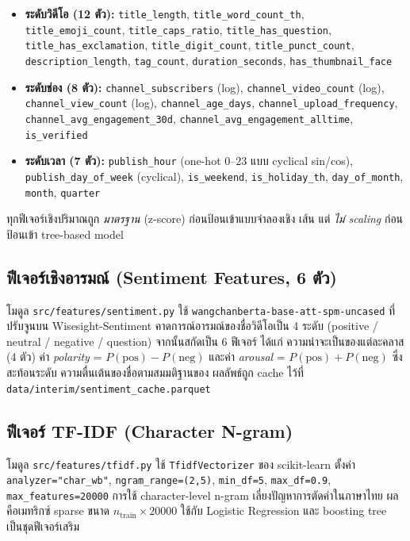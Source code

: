 \begin{itemize}[leftmargin=2em]
  \item \textbf{ระดับวิดีโอ (12 ตัว):} \texttt{title\_length},
        \texttt{title\_word\_count\_th}, \texttt{title\_emoji\_count},
        \texttt{title\_caps\_ratio}, \texttt{title\_has\_question},
        \texttt{title\_has\_exclamation}, \texttt{title\_digit\_count},
        \texttt{title\_punct\_count}, \texttt{description\_length},
        \texttt{tag\_count}, \texttt{duration\_seconds}, \texttt{has\_thumbnail\_face}
  \item \textbf{ระดับช่อง (8 ตัว):} \texttt{channel\_subscribers} (log),
        \texttt{channel\_video\_count} (log), \texttt{channel\_view\_count} (log),
        \texttt{channel\_age\_days}, \texttt{channel\_upload\_frequency},
        \texttt{channel\_avg\_engagement\_30d},
        \texttt{channel\_avg\_engagement\_alltime}, \texttt{is\_verified}
  \item \textbf{ระดับเวลา (7 ตัว):} \texttt{publish\_hour} (one-hot 0--23
        แบบ cyclical sin/cos), \texttt{publish\_day\_of\_week} (cyclical),
        \texttt{is\_weekend}, \texttt{is\_holiday\_th}, \texttt{day\_of\_month},
        \texttt{month}, \texttt{quarter}
\end{itemize}

ทุกฟีเจอร์เชิงปริมาณถูก \emph{มาตรฐาน} (z-score) ก่อนป้อนเข้าแบบจำลองเชิง
เส้น แต่ \emph{ไม่ scaling} ก่อนป้อนเข้า tree-based model

\subsection{ฟีเจอร์เชิงอารมณ์ (Sentiment Features, 6 ตัว)}

โมดูล \texttt{src/features/sentiment.py} ใช้ \texttt{wangchanberta-base-att-spm-uncased}
ที่ปรับจูนบน Wisesight-Sentiment คาดการณ์อารมณ์ของชื่อวิดีโอเป็น 4 ระดับ
(positive / neutral / negative / question) จากนั้นสกัดเป็น 6 ฟีเจอร์ ได้แก่
ความน่าจะเป็นของแต่ละคลาส (4 ตัว) ค่า \emph{polarity} = $P(\text{pos}) - P(\text{neg})$
และค่า \emph{arousal} = $P(\text{pos}) + P(\text{neg})$ ซึ่งสะท้อนระดับ
ความตื่นเต้นของชื่อตามสมมติฐานของ \textcite{berger2012makes}
ผลลัพธ์ถูก cache ไว้ที่ \texttt{data/interim/sentiment\_cache.parquet}

\subsection{ฟีเจอร์ TF-IDF (Character N-gram)}

โมดูล \texttt{src/features/tfidf.py} ใช้ \texttt{TfidfVectorizer} ของ
scikit-learn ตั้งค่า \texttt{analyzer="char\_wb"}, \texttt{ngram\_range=(2,5)},
\texttt{min\_df=5}, \texttt{max\_df=0.9}, \texttt{max\_features=20000}
การใช้ character-level n-gram เลี่ยงปัญหาการตัดคำในภาษาไทย ผลคือเมทริกซ์
sparse ขนาด $n_{\text{train}} \times 20000$ ใช้กับ Logistic Regression และ
boosting tree เป็นชุดฟีเจอร์เสริม


